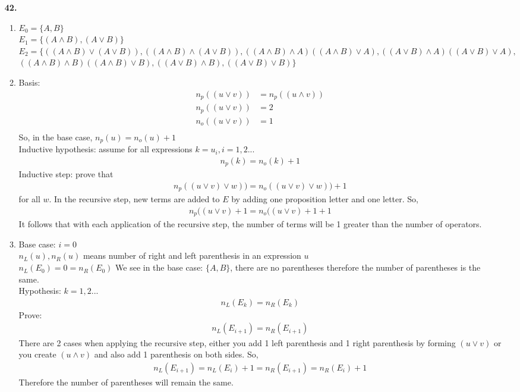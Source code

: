 \documentclass[]{article}
\begin{document}
\begin{flushleft}
\begin{enumerate}
\item[\textbf{42.}]
\begin{enumerate}
	\item $E_0 = \{A,B\}$\\
	$E_1 = \{(A\wedge B),(A\vee B)\}$\\
	$E_2 = \{((A\wedge B)\vee (A\vee B)),((A\wedge B)\wedge (A\vee B)),((A\wedge B)\wedge A)((A\wedge B)\vee A),((A\vee B)\wedge A)((A\vee B)\vee A),$\\
	$((A\wedge B)\wedge B)((A\wedge B)\vee B),((A\vee B)\wedge B),((A\vee B)\vee B) \}$\\
	\item Basis: 
	\begin{align*}
	n_p((u\vee v)) &= n_p((u\wedge v))\\
	n_p((u\vee v)) &= 2\\
	n_o((u\vee v)) &= 1\\
	\end{align*}
	So, in the base case, $n_p(u) = n_o(u) +1$\\
	Inductive hypothesis: assume for all expressions $k = u_i, i = 1,2...$
	\begin{align*}
	n_p(k) = n_o(k)+1
	\end{align*}
	Inductive step: prove that
	\begin{align*}
	n_p((u\vee v)\vee w)) = n_o((u\vee v)\vee w)) + 1
	\end{align*}
	for all $w$. In the recursive step, new terms are added to $E$ by adding one proposition letter and one letter. So,
	\begin{align*}
	n_p((u\vee v) + 1 = n_o((u\vee v) +1  + 1
	\end{align*}
	It follows that with each application of the recursive step, the number of terms will be 1 greater than the number of operators.
	
	\item Base case: $i=0$\\
	$n_L(u),n_R(u)$ means number of right and left parenthesis in an expression $u$\\
	$n_L(E_0) = 0 = n_R(E_0)$
	We see in the base case: $\{A,B\}$, there are no parentheses therefore the number of parentheses is the same.\\
	\bigskip
	Hypothesis:	$k = 1,2...$\\
	\begin{align*}
	n_L(E_k) = n_R(E_k)
	\end{align*}
	Prove:
	\begin{align*}
		n_L(E_{i+1}) = n_R(E_{i+1})
	\end{align*}
	There are 2 cases when applying the recursive step, either you add 1 left parenthesis and 1 right parenthesis by forming $(u\vee v)$ or you create $(u\wedge v)$ and also add 1 parenthesis on both sides. So,
	\begin{align*}
	n_L(E_{i+1}) = n_L(E_{i})+1=n_R(E_{i+1}) = n_R(E_{i})+1
	\end{align*}
	Therefore the number of parentheses will remain the same.
	

\end{enumerate}
\end{enumerate}
\end{flushleft}
\end{document}
